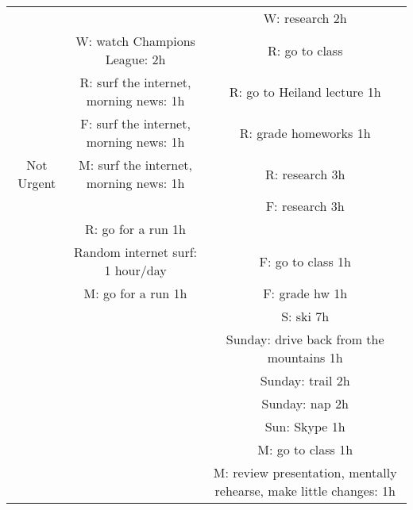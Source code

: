 \documentclass[10pt]{article}
\begin{document}
\begin{landscape}
\begin{tabular}{c|c|c}
             &                                              &  W: research 2h                                            \\
             &  W: watch Champions League: 2h               &  R: go to class                                            \\
             &  R: surf the internet, morning news: 1h      &  R: go to Heiland lecture 1h                               \\
             &  F: surf the internet, morning news: 1h      &  R: grade homeworks 1h                                     \\
  Not Urgent &  M: surf the internet, morning news: 1h      &  R: research 3h                                            \\
             &                                              &  F: research 3h                                       \\
             &   R: go for a run 1h                         &                                                            \\
             &  Random internet surf: 1 hour/day            &  F: go to class 1h                                    \\
             &   M: go for a run 1h                         &  F: grade hw 1h                                                           \\
             &                                              &  S: ski  7h                                     \\
             &                                              &  Sunday: drive back from the mountains 1h                               \\
             &                                              &  Sunday: trail 2h                                         \\
             &                                              &  Sunday: nap 2h                                             \\
             &                                              &  Sun: Skype 1h                                                           \\
             &                                              &  M: go to class 1h                                                      \\
             &                                              &  M: review presentation, mentally rehearse, make little changes: 1h \\

\end{tabular}
\end{landscape}
\end{document}
